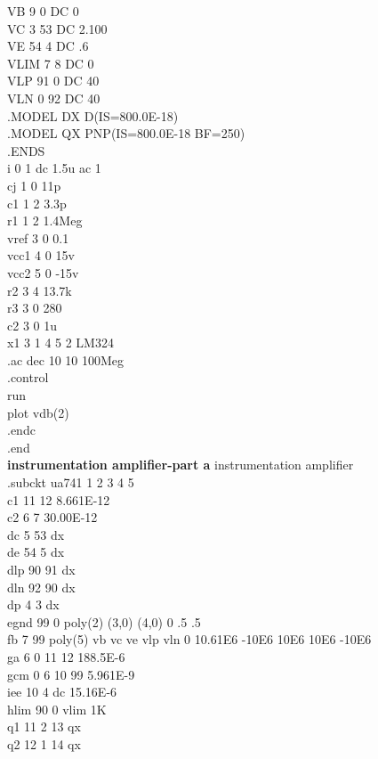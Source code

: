 \documentclass[12pt]{article}
\begin{document}
VB    9  0 DC 0\\
VC 3 53 DC 2.100\\
VE   54  4 DC .6\\
VLIM  7  8 DC 0\\
VLP  91  0 DC 40\\
VLN   0 92 DC 40\\
.MODEL DX D(IS=800.0E-18)\\
.MODEL QX PNP(IS=800.0E-18 BF=250)\\
.ENDS\\
\newpage
i 0 1 dc 1.5u ac 1\\
cj 1 0 11p\\
c1 1 2 3.3p\\
r1 1 2 1.4Meg\\
vref 3 0 0.1\\
vcc1 4 0 15v\\
vcc2 5 0 -15v\\
r2 3 4 13.7k\\
r3 3 0 280\\
c2 3 0 1u\\
x1 3 1 4 5 2 LM324\\ 
.ac dec 10 10 100Meg\\ 
.control\\
run\\
plot vdb(2)\\
.endc\\
.end\\
\newpage
\textbf{instrumentation amplifier-part a}
instrumentation amplifier\\
.subckt ua741    1  2  3  4  5\\
c1   11 12 8.661E-12\\
c2    6  7 30.00E-12\\
dc    5 53 dx\\
de   54  5 dx\\
dlp  90 91 dx\\
dln  92 90 dx\\
dp    4  3 dx\\
egnd 99  0 poly(2) (3,0) (4,0) 0 .5 .5\\
fb    7 99 poly(5) vb vc ve vlp vln 0 10.61E6 -10E6 10E6 10E6 -10E6\\
ga    6  0 11 12 188.5E-6\\
gcm   0  6 10 99 5.961E-9\\
iee  10  4 dc 15.16E-6\\
hlim 90  0 vlim 1K\\
q1   11  2 13 qx\\
q2   12  1 14 qx\\
\end{document}
